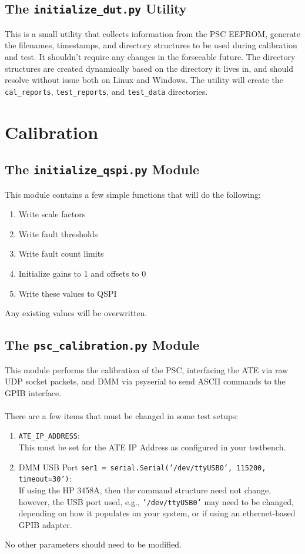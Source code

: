 \subsection{The \texttt{initialize\_dut.py} Utility}
This is a small utility that collects information from the PSC EEPROM, generate the filenames, timestamps, and directory structures to be used during calibration and test. It shouldn't require any changes in the forseeable future. The directory structures are created dynamically based on the directory it lives in, and should resolve without issue both on Linux and Windows. The utility will create the \texttt{cal\_reports}, \texttt{test\_reports}, and \texttt{test\_data} directories. 



\section{Calibration}
\subsection{The \texttt{initialize\_qspi.py} Module}
This module contains a few simple functions that will do the following:\\
\begin{enumerate}
	\item Write scale factors
	\item Write fault thresholds
	\item Write fault count limits
	\item Initialize gains to 1 and offsets to 0
	\item Write these values to QSPI
\end{enumerate}
Any existing values will be overwritten. 
\subsection{The \texttt{psc\_calibration.py} Module}
This module performs the calibration of the PSC, interfacing the ATE via raw UDP socket packets, and DMM via psyserial to send ASCII commands to the GPIB interface.\\\\
There are a few items that must be changed in some test setups:\\
\begin{enumerate}
	\item \texttt{ATE\_IP\_ADDRESS}:\\
	This must be set for the ATE IP Address as configured in your testbench.
	\item DMM USB Port \texttt{ser1 = serial.Serial('/dev/ttyUSB0', 115200, timeout=30')}:\\
	If using the HP 3458A, then the command structure need not change, however, the USB port used, e.g., \texttt{'/dev/ttyUSB0'} may need to be changed, depending on how it populates on your system, or if using an ethernet-based GPIB adapter.
\end{enumerate}
No other parameters should need to be modified.
